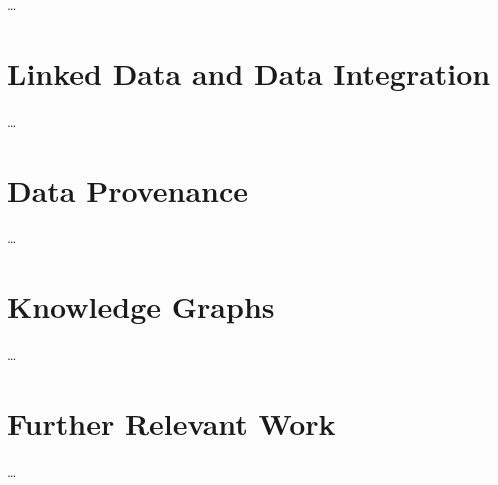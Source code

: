 \dots

\section{Linked Data and Data Integration}
\label{sec:linked_data+integration}

\dots


\section{Data Provenance}
\label{sec:data_provenance}

\dots


\section{Knowledge Graphs}
\label{sec:KGs}

\dots


\section{Further Relevant Work}
\label{sec:further}

\dots


